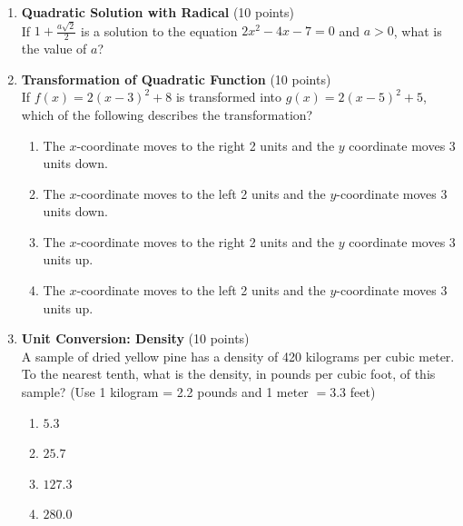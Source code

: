 \begin{enumerate}
  \item \textbf{Quadratic Solution with Radical} (10 points)\\
  If $1+\frac{a \sqrt{2}}{2}$ is a solution to the equation $2x^2-4x-7=0$ and $a>0$, what is the value of $a$?
  \begin{subanswer}
  \end{subanswer}

  \item \textbf{Transformation of Quadratic Function} (10 points)\\
  If $f(x)=2(x-3)^2+8$ is transformed into $g(x)=2(x-5)^2+5$, which of the following describes the transformation?
  \begin{enumerate}[label=\Alph*.]
    \item The $x$-coordinate moves to the right 2 units and the $y$ coordinate moves 3 units down.
    \item The $x$-coordinate moves to the left 2 units and the $y$-coordinate moves 3 units down.
    \item The $x$-coordinate moves to the right 2 units and the $y$ coordinate moves 3 units up.
    \item The $x$-coordinate moves to the left 2 units and the $y$-coordinate moves 3 units up.
  \end{enumerate}
  \begin{subanswer}
  \end{subanswer}

  \newpage

  \item \textbf{Unit Conversion: Density} (10 points)\\
  A sample of dried yellow pine has a density of 420 kilograms per cubic meter. To the nearest tenth, what is the density, in pounds per cubic foot, of this sample? (Use 1 kilogram = 2.2 pounds and 1 meter $=3.3$ feet)
  \begin{enumerate}[label=\Alph*.]
    \item $5.3$
    \item $25.7$
    \item $127.3$
    \item $280.0$
  \end{enumerate}
  \begin{subanswer}
  \end{subanswer}


\end{enumerate}
